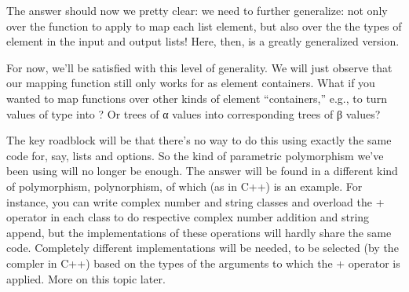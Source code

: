 \documentclass[letterpaper,10pt,english]{sphinxmanual}
\begin{document}
\sphinxAtStartPar
The answer should now we pretty clear: we need to further
generalize: not only over the function to apply to map each
list element, but also over the the types of element in the
input and output lists! Here, then, is a greatly generalized
version.

\begin{sphinxVerbatim}[commandchars=\\\{\}]
               
    
         

   \PYG{o}{[}\PYG{o}{]}
   \PYG{o}{[}  \PYG{o}{]}
\end{sphinxVerbatim}

\sphinxAtStartPar
For now, we’ll be satisfied with this level of generality.
We will just observe that our mapping function still only
works for  as element containers. What if you wanted
to map functions over other kinds of element “containers,”
e.g., to turn values of type  into ?
Or trees of α values into corresponding trees of β values?

\sphinxAtStartPar
The key roadblock will be that there’s no way to do this
using exactly the same code for, say, lists and options.
So the kind of parametric polymorphism we’ve been using
will no longer be enough. The answer will be found in a
different kind of polymorphism,  polynorphism, of
which  (as in C++) is an example.
For instance, you can write complex number and string
classes and overload the + operator in each class to do
respective complex number addition and string append, but
the implementations of these operations will hardly share
the same code. Completely different implementations will
be needed, to be selected (by the compler in C++) based
on the types of the arguments to which the + operator is
applied.  More on this topic later.
\end{document}
